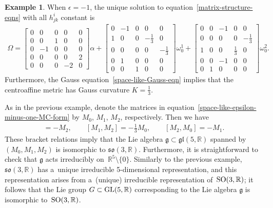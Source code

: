 \documentclass[10pt,a4paper]{amsart}
\numberwithin{equation}{section}
\theoremstyle{definition}
\newtheorem{exmpl}[teo]{Example}
\begin{document}
\begin{exmpl}
\label{space-like-epsilon-minus-one}
When $\epsilon=-1$, the unique solution to equation~\eqref{matrix-structure-eqns} with all $h^i_{jk}$ constant is
\begin{gather}
\Omega =
\begin{bmatrix}
0 & 0 & 0 & 0 & 0
\\
0 & 0 & 1 & 0 & 0
\\
0 & -1 & 0 & 0 & 0
\\
0 & 0 & 0 & 0 & 2
\\
0 & 0 & 0 & -2 & 0
\end{bmatrix}
\alpha +
\begin{bmatrix}
0 & -1 & 0 & 0 & 0
\\
1 & 0 & 0 & -\tfrac{1}{3} & 0
\\
0 & 0 & 0 & 0 & -\tfrac{1}{3}
\\
0 & 1 & 0 & 0 & 0
\\
0 & 0 & 1 & 0 & 0
\end{bmatrix}
\omega^1_0 +
\begin{bmatrix}
0 & 0 & -1 & 0 & 0
\\
0 & 0 & 0 & 0 & -\tfrac{1}{3}
\\
1 & 0 & 0 & \tfrac{1}{3} & 0
\\
0 & 0 & -1 & 0 & 0
\\
0 & 1 & 0 & 0 & 0
\end{bmatrix}
\omega^2_0.
\label{space-like-epsilon-minus-one-MC-form}
\end{gather}
Furthermore, the Gauss equation~\eqref{space-like-Gauss-eqn} implies that the centroaf\/f\/ine metric has Gauss curvature $K
= \tfrac{1}{3}$.

As in the previous example, denote the matrices in equation~\eqref{space-like-epsilon-minus-one-MC-form} by $M_0$, $M_1$, $M_2$, respectively.
Then we have
\begin{gather*}
[M_0, M_1] = -M_2,
\qquad
[M_1, M_2] = -\tfrac{1}{3} M_0,
\qquad
[M_2, M_0] = -M_1.
\end{gather*}
These bracket relations imply that the Lie algebra $\mathfrak{g} \subset \mathfrak{gl}(5,\mathbb{R})$ spanned by $(M_0,
M_1, M_2)$ is isomorphic to $\mathfrak{so}(3,\mathbb{R})$.
Furthermore, it is straightforward to check that $\mathfrak{g}$ acts irreducibly on~$\mathbb{R}^5 \setminus \{0 \}$.
Similarly to the previous example, $\mathfrak{so}(3,\mathbb{R})$ has a~unique irreducible 5-dimensional representation,
and this representation arises from a~(unique) irreducible representation of~${\rm SO}(3,\mathbb{R})$; it follows that
the Lie group $G \subset {\rm GL}(5,\mathbb{R})$ corresponding to the Lie algebra $\mathfrak{g}$ is isomorphic to~${\rm
SO}(3,\mathbb{R})$.


\end{exmpl}
\end{document}
